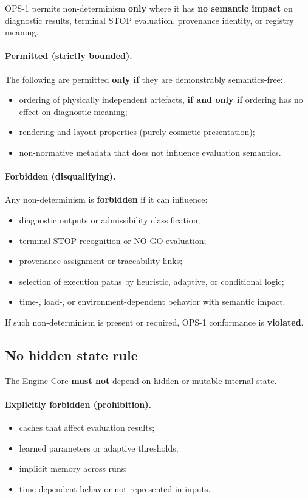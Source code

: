 OPS-1 permits non-determinism \textbf{only} where it has
\textbf{no semantic impact} on diagnostic results,
terminal STOP evaluation, provenance identity,
or registry meaning.

\paragraph{Permitted (strictly bounded).}
The following are permitted \textbf{only if}
they are demonstrably semantics-free:
\begin{itemize}
  \item ordering of physically independent artefacts,
        \textbf{if and only if} ordering has no effect
        on diagnostic meaning;
  \item rendering and layout properties
        (purely cosmetic presentation);
  \item non-normative metadata
        that does not influence evaluation semantics.
\end{itemize}

\paragraph{Forbidden (disqualifying).}
Any non-determinism is \textbf{forbidden}
if it can influence:
\begin{itemize}
  \item diagnostic outputs or admissibility classification;
  \item terminal STOP recognition or NO-GO evaluation;
  \item provenance assignment or traceability links;
  \item selection of execution paths by heuristic,
        adaptive, or conditional logic;
  \item time-, load-, or environment-dependent behavior
        with semantic impact.
\end{itemize}

If such non-determinism is present or required,
OPS-1 conformance is \textbf{violated}.

\subsection{No hidden state rule}

The Engine Core \textbf{must not} depend on hidden
or mutable internal state.

\paragraph{Explicitly forbidden (prohibition).}
\begin{itemize}
  \item caches that affect evaluation results;
  \item learned parameters or adaptive thresholds;
  \item implicit memory across runs;
  \item time-dependent behavior not represented in inputs.
\end{itemize}

